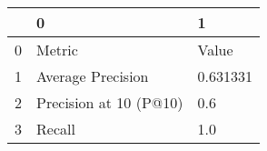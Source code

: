 \begin{tabular}{lll}
\toprule
{} &                       0 &         1 \\
\midrule
0 &                  Metric &     Value \\
1 &       Average Precision &  0.631331 \\
2 &  Precision at 10 (P@10) &       0.6 \\
3 &                  Recall &       1.0 \\
\bottomrule
\end{tabular}
